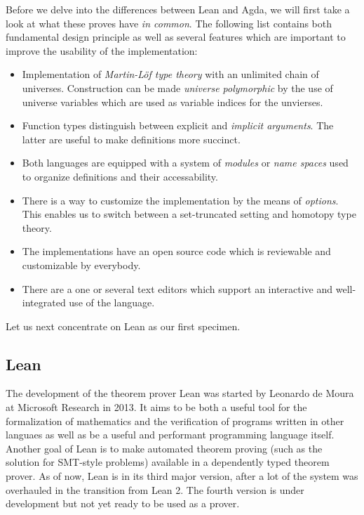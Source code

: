 Before we delve into the differences between Lean and Agda, we will first
take a look at what these proves have \emph{in common}.
The following list contains both fundamental design principle as well as
several features which are important to improve the usability of the
implementation:
\begin{itemize}
\item Implementation of \emph{Martin-Löf type theory} with an unlimited chain of universes.
Construction can be made \emph{universe polymorphic} by the use of
universe variables which are used as variable indices for the unvierses.
\item Function types distinguish between explicit and \emph{implicit arguments}.
The latter are useful to make definitions more succinct.
\item Both languages are equipped with a system of \emph{modules} or \emph{name spaces}
used to organize definitions and their accessability.
\item There is a way to customize the implementation by the means of \emph{options}.
This enables us to switch between a set-truncated setting and
homotopy type theory.
\item The implementations have an open source code which is reviewable and
customizable by everybody.
\item There are a one or several text editors which support an interactive
and well-integrated use of the language.
\end{itemize}

Let us next concentrate on Lean as our first specimen.

\subsection{Lean}\label{sec:tt-lean}

The development of the theorem prover Lean was started by
Leonardo de Moura at Microsoft Research in 2013.
It aims to be both a useful tool for the formalization of mathematics and
the verification of programs written in other languaes as well as
be a useful and performant programming language itself.
Another goal of Lean is to make automated theorem proving (such as the solution
for SMT-style problems) available in a dependently typed theorem prover.
As of now, Lean is in its third major version, after a lot of the system was
overhauled in the transition from Lean 2.
The fourth version is under development but not yet ready to be used as a prover.

